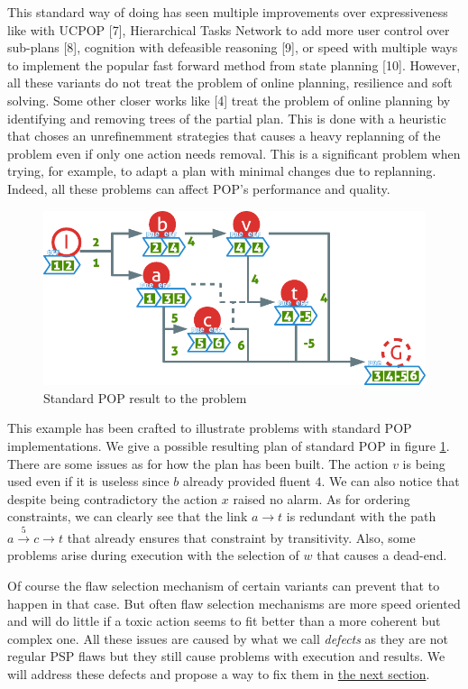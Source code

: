 \documentclass[]{article}
\begin{document}
This standard way of doing has seen multiple improvements over
expressiveness like with UCPOP {[}7{]}, Hierarchical Tasks Network to
add more user control over sub-plans {[}8{]}, cognition with defeasible
reasoning {[}9{]}, or speed with multiple ways to implement the popular
fast forward method from state planning {[}10{]}. However, all these
variants do not treat the problem of online planning, resilience and
soft solving. Some other closer works like {[}4{]} treat the problem of
online planning by identifying and removing trees of the partial plan.
This is done with a heuristic that choses an unrefinemment strategies
that causes a heavy replanning of the problem even if only one action
needs removal. This is a significant problem when trying, for example,
to adapt a plan with minimal changes due to replanning. Indeed, all
these problems can affect POP's performance and quality.

\begin{figure}[htbp]
\centering
\includegraphics{graphics/pop.pdf}
\caption{Standard POP result to the problem\label{fig:pop}}
\end{figure}

This example has been crafted to illustrate problems with standard POP
implementations. We give a possible resulting plan of standard POP in
figure \ref{fig:pop}. There are some issues as for how the plan has been
built. The action \(v\) is being used even if it is useless since \(b\)
already provided fluent \(4\). We can also notice that despite being
contradictory the action \(x\) raised no alarm. As for ordering
constraints, we can clearly see that the link \(a \to t\) is redundant
with the path \(a \xrightarrow{5} c \to t\) that already ensures that
constraint by transitivity. Also, some problems arise during execution
with the selection of \(w\) that causes a dead-end.

Of course the flaw selection mechanism of certain variants can prevent
that to happen in that case. But often flaw selection mechanisms are
more speed oriented and will do little if a toxic action seems to fit
better than a more coherent but complex one. All these issues are caused
by what we call \emph{defects} as they are not regular PSP flaws but
they still cause problems with execution and results. We will address
these defects and propose a way to fix them in
\protect\hyperlink{defects}{the next section}.
\end{document}
